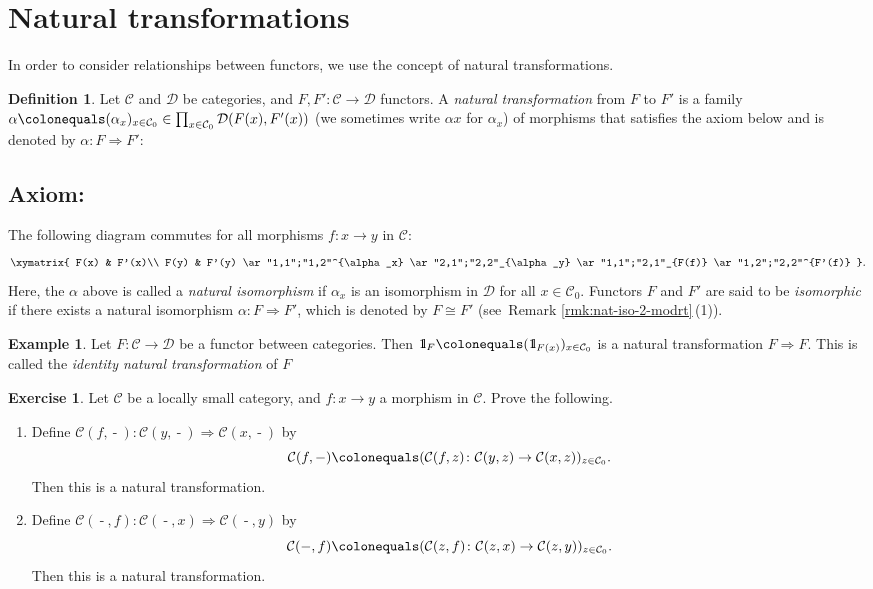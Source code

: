 \documentclass{surv-l}
\numberwithin{equation}{chapter}
\numberwithin{figure}{chapter}
\theoremstyle{plain}
\theoremstyle{definition}
\newtheorem{dfn}[thm]{Definition}
\newtheorem{exm}[thm]{Example}
\newtheorem{exc}[thm]{Exercise}
\theoremstyle{remark}
\newcommand{\id}{1\kern-.25em{\text{{\rm l}}}}
\DeclareMathOperator{\blank}{-}
\begin{document}
\section{Natural transformations}In order to consider relationships between functors,
we use the concept of natural transformations.

\begin{dfn}
Let ${\mathcal{C}}$ and ${\mathcal{D}}$ be categories, and
$F, F' \colon {\mathcal{C}} \to {\mathcal{D}}$ functors.
A \emph{natural transformation} from $F$ to $F'$ is a family
$\alpha\colonequals (\alpha_x)_{x \in {\mathcal{C}}_0} \in \prod_{x \in {\mathcal{C}}_0}{\mathcal{D}}(F(x), \linebreak[3] F'(x))$
(we sometimes write $\alpha x$ for $\alpha_x$)
of morphisms that satisfies the axiom below and is denoted by $\alpha \colon F \Rightarrow F'$:

\subsection*{Axiom:}
The following diagram commutes for all morphisms $f \colon x\to y$ in ${\mathcal{C}}$:
\[
\xymatrix{
F(x) & F'(x)\\
F(y) & F'(y)
\ar"1,1";"1,2"^{\alpha_x}
\ar"2,1";"2,2"_{\alpha_y}
\ar"1,1";"2,1"_{F(f)}
\ar"1,2";"2,2"^{F'(f)}
}.
\]
Here, the $\alpha$ above is called a \emph{natural isomorphism} if $\alpha_x$ is an isomorphism in ${\mathcal{D}}$
for all $x \in {\mathcal{C}}_0$.
Functors $F$ and $F'$ are said to be \emph{isomorphic}
if there exists a natural isomorphism $\alpha \colon F \Rightarrow F'$, which is denoted by $F \cong F'$ (see\ Remark \ref{rmk:nat-iso-2-modrt}\,(1)).
\end{dfn}

\begin{exm}\label{exm:id-nt-tr}
Let $F \colon {\mathcal{C}} \to {\mathcal{D}}$ be a functor between categories.
Then $\id_F\colonequals  (\id_{F(x)})_{x \in {\mathcal{C}}_0}$ is a natural transformation $F \Rightarrow F$.
This is called the \emph{identity natural transformation} of $F$
\end{exm}

\begin{exc}
Let ${\mathcal{C}}$ be a locally small category, and $f\colon x \to y$ a morphism in ${\mathcal{C}}$.
Prove the following.
\begin{enumerate}
\item
Define ${\mathcal{C}}(f, \blank) \colon {\mathcal{C}}(y, \blank) \Rightarrow {\mathcal{C}}(x, \blank)$ by
\[
{\mathcal{C}}(f, \blank)\colonequals  ({\mathcal{C}}(f,z)\colon {\mathcal{C}}(y,z) \to {\mathcal{C}}(x,z))_{z\in {\mathcal{C}}_0}.
\]
Then this is a natural transformation.
\item
Define ${\mathcal{C}}(\blank, f) \colon {\mathcal{C}}(\blank, x) \Rightarrow {\mathcal{C}}(\blank, y)$ by
\[
{\mathcal{C}}(\blank, f)\colonequals  ({\mathcal{C}}(z, f)\colon {\mathcal{C}}(z, x) \to {\mathcal{C}}(z, y))_{z\in {\mathcal{C}}_0}.
\]
Then this is a natural transformation.
\end{enumerate}
\end{exc}
\end{document}
